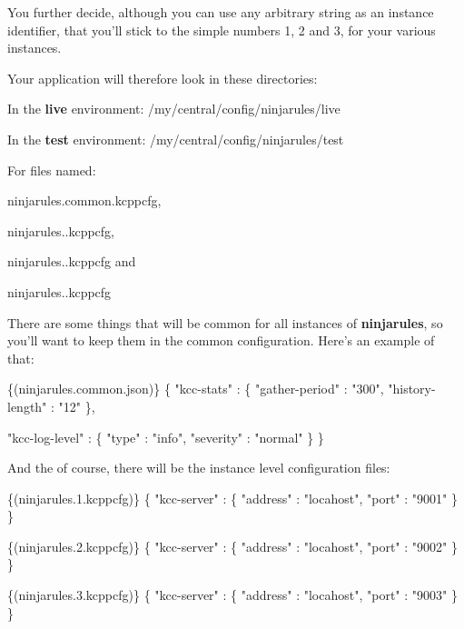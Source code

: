 You further decide, although you can use any arbitrary string as an instance identifier, that you'll stick to the simple numbers 1, 2 and 3, for your various instances.

Your application will therefore look in these directories\-:
\begin{DoxyItemize}
\item In the {\bfseries live} environment\-: /my/central/config/ninjarules/live
\item In the {\bfseries test} environment\-: /my/central/config/ninjarules/test
\end{DoxyItemize}

For files named\-:
\begin{DoxyItemize}
\item ninjarules.\-common.\-kcppcfg,
\item ninjarules..\-kcppcfg,
\item ninjarules..\-kcppcfg and
\item ninjarules..\-kcppcfg
\end{DoxyItemize}

There are some things that will be common for all instances of {\bfseries ninjarules}, so you'll want to keep them in the common configuration. Here's an example of that\-: 
\begin{DoxyCode}
\{(ninjarules.common.json)\}
\{
  \textcolor{stringliteral}{"kcc-stats"}     : \{
    \textcolor{stringliteral}{"gather-period"}  : \textcolor{stringliteral}{"300"},
    \textcolor{stringliteral}{"history-length"} : \textcolor{stringliteral}{"12"}
  \},

  \textcolor{stringliteral}{"kcc-log-level"} : \{
    \textcolor{stringliteral}{"type"}           : \textcolor{stringliteral}{"info"},
    \textcolor{stringliteral}{"severity"}       : \textcolor{stringliteral}{"normal"}
  \}
\}
\end{DoxyCode}


And the of course, there will be the instance level configuration files\-: 
\begin{DoxyCode}
\{(ninjarules.1.kcppcfg)\}
\{
  \textcolor{stringliteral}{"kcc-server"}    : \{
    \textcolor{stringliteral}{"address"}        : \textcolor{stringliteral}{"locahost"},
    \textcolor{stringliteral}{"port"}           : \textcolor{stringliteral}{"9001"}
  \}
\}
\end{DoxyCode}
 
\begin{DoxyCode}
\{(ninjarules.2.kcppcfg)\}
\{
  \textcolor{stringliteral}{"kcc-server"}    : \{
    \textcolor{stringliteral}{"address"}        : \textcolor{stringliteral}{"locahost"},
    \textcolor{stringliteral}{"port"}           : \textcolor{stringliteral}{"9002"}
  \}
\}
\end{DoxyCode}
 
\begin{DoxyCode}
\{(ninjarules.3.kcppcfg)\}
\{
  \textcolor{stringliteral}{"kcc-server"}    : \{
    \textcolor{stringliteral}{"address"}        : \textcolor{stringliteral}{"locahost"},
    \textcolor{stringliteral}{"port"}           : \textcolor{stringliteral}{"9003"}
  \}
\}
\end{DoxyCode}
 